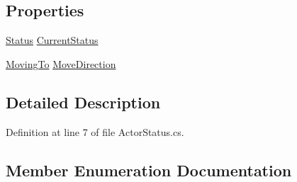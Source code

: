 \subsection*{Properties}
\begin{DoxyCompactItemize}
\item 
\hyperlink{class_g_t_core_1_1_general_1_1_actor_status_a8a2ef18692e51ef1c72e0a6478ef62e2}{Status} \hyperlink{class_g_t_core_1_1_general_1_1_actor_status_a9181dd383318ffc47c661a22f1ce3ca2}{Current\+Status}
\item 
\hyperlink{class_g_t_core_1_1_general_1_1_actor_status_aece73cbcbe7407c6f473f67fabdca2af}{Moving\+To} \hyperlink{class_g_t_core_1_1_general_1_1_actor_status_a8b6609e98a371dbf2918ca249ff94d78}{Move\+Direction}
\end{DoxyCompactItemize}


\subsection{Detailed Description}


Definition at line 7 of file Actor\+Status.\+cs.



\subsection{Member Enumeration Documentation}
\hypertarget{class_g_t_core_1_1_general_1_1_actor_status_aece73cbcbe7407c6f473f67fabdca2af}{}
